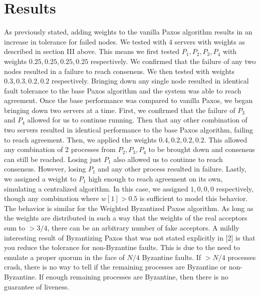 \documentclass[conference]{IEEEtran}
\begin{document}
\section{Results}
As previously stated, adding weights to the vanilla Paxos algorithm results in an increase in tolerance for failed nodes. We tested with 4 servers with weights as described in section III above. This means we first tested ${P_1, P_2, P_3, P_4}$ with weights ${0.25, 0.25, 0.25, 0.25}$ respectively. We confirmed that the failure of any two nodes resulted in a failure to reach consensus. We then tested with weights ${0.3, 0.3, 0.2, 0.2}$ respectively. Bringing down any single node resulted in identical fault tolerance to the base Paxos algorithm and the system was able to reach agreement.
Once the base performance was compared to vanilla Paxos, we began bringing down two servers at a time. First, we confirmed that the failure of $P_3$ and $P_4$ allowed for us to continue running. Then that any other combination of two servers resulted in identical performance to the base Paxos algorithm, failing to reach agreement.
Then, we applied the weights ${0.4, 0.2, 0.2, 0.2}$. This allowed any combination of 2 processes from ${P_2, P_3, P_4}$ to be brought down and consensus can still be reached. Losing just $P_1$ also allowed us to continue to reach consensus. However, losing $P_1$ and any other process resulted in failure.
Lastly, we assigned a weight to $P_1$ high enough to reach agreement on its own, simulating a centralized algorithm. In this case, we assigned ${1, 0, 0, 0}$ respectively, though any combination where $w[1] > 0.5$ is sufficient to model this behavior.
The behavior is similar for the Weighted Byzantized Paxos algorithm. As long as the weights are distributed in such a way that the weights of the real acceptors sum to $> 3/4$, there can be an arbitrary number of fake acceptors.
A mildly interesting result of Byzantizing Paxos that was not stated explicitly in [2] is that you reduce the tolerance for non-Byzantine faults. This is due to the need to emulate a proper quorum in the face of $N/4$ Byzantine faults. If $> N/4$ processes crash, there is no way to tell if the remaining processes are Byzantine or non-Byzantine. If enough remaining processes are Byzantine, then there is no guarantee of liveness.
\end{document}
